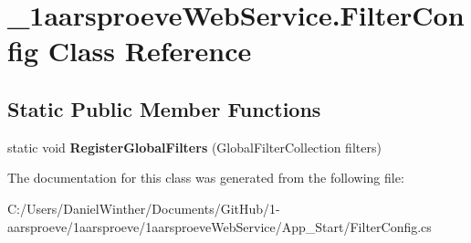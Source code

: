 \hypertarget{class__1aarsproeve_web_service_1_1_filter_config}{}\section{\+\_\+1aarsproeve\+Web\+Service.\+Filter\+Config Class Reference}
\label{class__1aarsproeve_web_service_1_1_filter_config}
\subsection*{Static Public Member Functions}
\begin{DoxyCompactItemize}
\item 
\hypertarget{class__1aarsproeve_web_service_1_1_filter_config_aa408c602cd6d9244e1299d9c2ab9566e}{}static void {\bfseries Register\+Global\+Filters} (Global\+Filter\+Collection filters)\label{class__1aarsproeve_web_service_1_1_filter_config_aa408c602cd6d9244e1299d9c2ab9566e}

\end{DoxyCompactItemize}


The documentation for this class was generated from the following file\+:\begin{DoxyCompactItemize}
\item 
C\+:/\+Users/\+Daniel\+Winther/\+Documents/\+Git\+Hub/1-\/aarsproeve/1aarsproeve/1aarsproeve\+Web\+Service/\+App\+\_\+\+Start/Filter\+Config.\+cs\end{DoxyCompactItemize}
